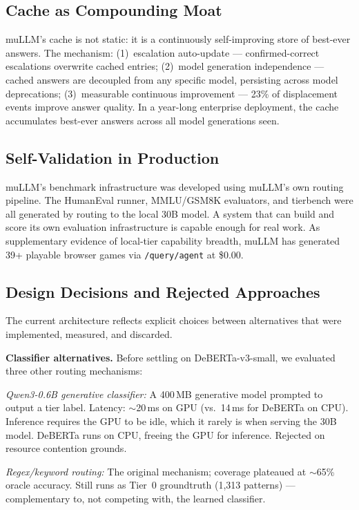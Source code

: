 \documentclass[11pt]{article}
\begin{document}
\subsection{Cache as Compounding Moat}

muLLM's cache is not static: it is a continuously self-improving store
of best-ever answers. The mechanism: (1)~escalation auto-update ---
confirmed-correct escalations overwrite cached entries; (2)~model
generation independence --- cached answers are decoupled from any
specific model, persisting across model deprecations; (3)~measurable
continuous improvement --- 23\% of displacement events improve answer
quality. In a year-long enterprise deployment, the cache accumulates
best-ever answers across all model generations seen.

\subsection{Self-Validation in Production}

muLLM's benchmark infrastructure was developed using muLLM's own
routing pipeline. The HumanEval runner, MMLU/GSM8K evaluators, and
tierbench were all generated by routing to the local 30B model. A system
that can build and score its own evaluation infrastructure is capable
enough for real work. As supplementary evidence of local-tier capability
breadth, muLLM has generated 39+ playable browser games via
\texttt{/query/agent} at \$0.00.

\subsection{Design Decisions and Rejected Approaches}

The current architecture reflects explicit choices between alternatives
that were implemented, measured, and discarded.

\textbf{Classifier alternatives.} Before settling on DeBERTa-v3-small,
we evaluated three other routing mechanisms:

\textit{Qwen3-0.6B generative classifier:} A 400\,MB generative model
prompted to output a tier label. Latency: $\sim$20\,ms on GPU (vs.\
14\,ms for DeBERTa on CPU). Inference requires the GPU to be idle,
which it rarely is when serving the 30B model. DeBERTa runs on CPU,
freeing the GPU for inference. Rejected on resource contention grounds.

\textit{Regex/keyword routing:} The original mechanism; coverage
plateaued at $\sim$65\% oracle accuracy. Still runs as Tier~0
groundtruth (1,313 patterns) --- complementary to, not competing with,
the learned classifier.
\end{document}
